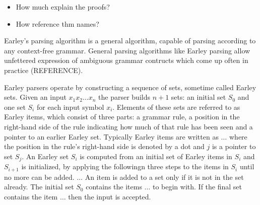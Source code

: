 %
\begin{isabellebody}%
%
%
\isadelimtheory
%
\endisadelimtheory
%
\isatagtheory
%
\endisatagtheory
{\isafoldtheory}%
%
\isadelimtheory
%
\endisadelimtheory
%
\isadelimdocument
%
\endisadelimdocument
%
\isatagdocument
%
\isamarkuptrue%
%
\endisatagdocument
{\isafolddocument}%
%
\isadelimdocument
%
\endisadelimdocument
%
\begin{isamarkuptext}%
\begin{itemize}
    \item How much explain the proofs? \\
    \item How reference thm names? \\
  \end{itemize}%
\end{isamarkuptext}\isamarkuptrue%
%
\isadelimdocument
%
\endisadelimdocument
%
\isatagdocument
%
\isamarkuptrue%
%
\isamarkuptrue%
%
\isamarkuptrue%
%
\isamarkuptrue%
%
\isamarkuptrue%
%
\endisatagdocument
{\isafolddocument}%
%
\isadelimdocument
%
\endisadelimdocument
%
\begin{isamarkuptext}%
Earley's parsing algorithm is a general algorithm, capable of parsing according to any context-free
grammar. General parsing algorithms like Earley parsing allow unfettered expression of ambiguous grammar
contructs which come up often in practice (REFERENCE).

Earley parsers operate by constructing a sequence of sets, sometime called Earley sets. Given an input
$x_1 x_2 \dots x_n$ the parser builds $n+1$ sets: an initial set $S_0$ and one set $S_i$ for each input
symbol $x_i$. Elements of these sets are referred to as Earley items, which consist of three parts:
a grammar rule, a position in the right-hand side of the rule indicating how much of that rule has been
seen and a pointer to an earlier Earley set. Typically Earley items are written as $\dots$ where the position
in the rule's right-hand side is denoted by a dot and $j$ is a pointer to set $S_j$.
An Earley set $S_i$ is computed from an initial set of Earley items in $S_i$ and $S_{i+1}$ is initialized, by
applying the followingn three steps to the items in $S_i$ until no more can be added. $\dots$
An item is added to a set only if it is not in the set already. The initial set $S_0$ contains the items $\dots$
to begin with. If the final set contains the item $\dots$ then the input is accepted.


\end{isamarkuptext}
\end{isabellebody}
